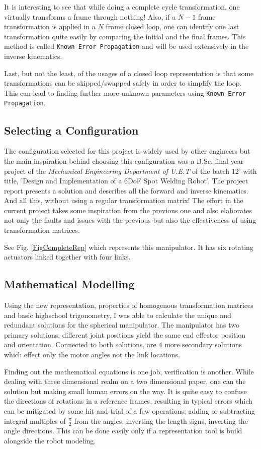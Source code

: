 {{        It is interesting to see that while doing a complete cycle transformation, one virtually transforms a frame through nothing! Also, if a $N-1$ frame transformation is applied in a $N$ frame closed loop, one can identify one last transformation quite easily by comparing the initial and the final frames. This method is called \texttt{Known Error Propagation} and will be used extensively in the inverse kinematics.

        Last, but not the least, of the usages of a closed loop representation is that some transformations can be skipped/swapped safely in order to simplify the loop. This can lead to finding further more unknown parameters using \texttt{Known Error Propagation}.

    }
    \subsection{Selecting a Configuration}
    {
        The configuration selected for this project is widely used by other engineers but the main inspiration behind choosing this configuration was a B.Sc. final year project of the \emph{Mechanical Engineering Department of U.E.T} of the batch $12$' with title, 'Design and Implementation of a $6$DoF Spot Welding Robot'. The project report presents a solution and describes all the forward and inverse kinematics. And all this, without using a regular transformation matrix! The effort in the current project takes some inspiration from the previous one and also elaborates not only the faults and issues with the previous but also the effectiveness of using transformation matrices.

        See Fig. \ref{FigCompleteRep} which represents this manipulator. It has six rotating actuators linked together with four links.
    }
    \subsection{Mathematical Modelling}
    {
        Using the new representation, properties of homogenous transformation matrices and basic highschool trigonometry, I was able to calculate \cite{bib21} the unique and redundant solutions for the spherical manipulator. The manipulator has two primary solutions: different joint positions yield the same end effector position and orientation. Connected to both solutions, are $4$ more secondary solutions which effect only the motor angles not the link locations.

        Finding out the mathematical equations is one job, verification is another. While dealing with three dimensional realm on a two dimensional paper, one can the solution but making small human errors on the way. It is quite easy to confuse the directions of rotations in a reference frames, resulting in typical errors which can be mitigated by some hit-and-trial of a few operations; adding or subtracting integral multiples of $\frac{\pi}{2}$ from the angles, inverting the length signs, inverting the angle directions. This can be done easily only if a representation tool is build alongside the robot modeling.
    }

}
